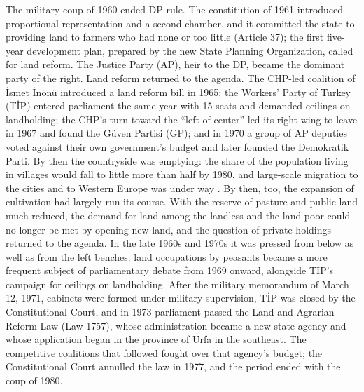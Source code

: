 \documentclass[12pt]{article}
\begin{document}
The military coup of 1960 ended DP rule. The constitution of 1961 introduced proportional representation and a second chamber, and it committed the state to providing land to farmers who had none or too little (Article 37); the first five-year development plan, prepared by the new State Planning Organization, called for land reform. The Justice Party (AP), heir to the DP, became the dominant party of the right. Land reform returned to the agenda. The CHP-led coalition of İsmet İnönü introduced a land reform bill in 1965; the Workers' Party of Turkey (TİP) entered parliament the same year with 15 seats and demanded ceilings on landholding; the CHP's turn toward the ``left of center'' led its right wing to leave in 1967 and found the Güven Partisi (GP); and in 1970 a group of AP deputies voted against their own government's budget and later founded the Demokratik Parti. By then the countryside was emptying: the share of the population living in villages would fall to little more than half by 1980, and large-scale migration to the cities and to Western Europe was under way \citep{pamuk2018}. By then, too, the expansion of cultivation had largely run its course. With the reserve of pasture and public land much reduced, the demand for land among the landless and the land-poor could no longer be met by opening new land, and the question of private holdings returned to the agenda. In the late 1960s and 1970s it was pressed from below as well as from the left benches: land occupations by peasants became a more frequent subject of parliamentary debate from 1969 onward, alongside TİP's campaign for ceilings on landholding. After the military memorandum of March 12, 1971, cabinets were formed under military supervision, TİP was closed by the Constitutional Court, and in 1973 parliament passed the Land and Agrarian Reform Law (Law 1757), whose administration became a new state agency and whose application began in the province of Urfa in the southeast. The competitive coalitions that followed fought over that agency's budget; the Constitutional Court annulled the law in 1977, and the period ended with the coup of 1980.
\end{document}
